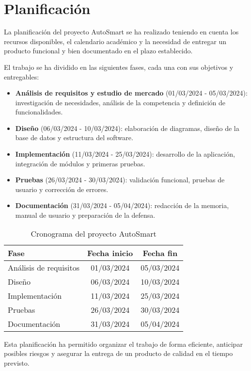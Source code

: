 \chapter{Planificación}

La planificación del proyecto AutoSmart se ha realizado teniendo en cuenta los recursos disponibles, el calendario académico y la necesidad de entregar un producto funcional y bien documentado en el plazo establecido.

El trabajo se ha dividido en las siguientes fases, cada una con sus objetivos y entregables:

\begin{itemize}
    \item \textbf{Análisis de requisitos y estudio de mercado} (01/03/2024 - 05/03/2024): investigación de necesidades, análisis de la competencia y definición de funcionalidades.
    \item \textbf{Diseño} (06/03/2024 - 10/03/2024): elaboración de diagramas, diseño de la base de datos y estructura del software.
    \item \textbf{Implementación} (11/03/2024 - 25/03/2024): desarrollo de la aplicación, integración de módulos y primeras pruebas.
    \item \textbf{Pruebas} (26/03/2024 - 30/03/2024): validación funcional, pruebas de usuario y corrección de errores.
    \item \textbf{Documentación} (31/03/2024 - 05/04/2024): redacción de la memoria, manual de usuario y preparación de la defensa.
\end{itemize}

\begin{table}[h!]
\centering
\begin{tabular}{|l|c|c|}
\hline
\textbf{Fase} & \textbf{Fecha inicio} & \textbf{Fecha fin} \\
\hline
Análisis de requisitos & 01/03/2024 & 05/03/2024 \\
Diseño & 06/03/2024 & 10/03/2024 \\
Implementación & 11/03/2024 & 25/03/2024 \\
Pruebas & 26/03/2024 & 30/03/2024 \\
Documentación & 31/03/2024 & 05/04/2024 \\
\hline
\end{tabular}
\caption{Cronograma del proyecto AutoSmart}
\end{table}

Esta planificación ha permitido organizar el trabajo de forma eficiente, anticipar posibles riesgos y asegurar la entrega de un producto de calidad en el tiempo previsto. 